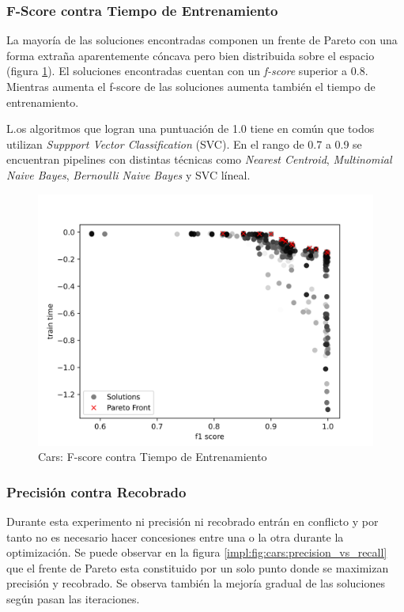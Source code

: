 \subsubsection{F-Score contra Tiempo de Entrenamiento}
La mayor\'ia de las soluciones encontradas componen un frente de Pareto con una forma extra\~na aparentemente c\'oncava pero bien distribuida sobre el espacio (figura \ref{impl:fig:cars:fscore_vs_time}).  El soluciones encontradas cuentan con un \textit{f-score} superior a 0.8. Mientras aumenta el f-score de las soluciones aumenta tambi\'en el tiempo de entrenamiento.

L.os algoritmos que logran una puntuaci\'on de 1.0 tiene en com\'un que todos utilizan \textit{Suppport Vector Classification} (SVC). En el rango de 0.7 a 0.9 se encuentran pipelines con distintas t\'ecnicas como \textit{Nearest Centroid}, \textit{Multinomial Naive Bayes}, \textit{Bernoulli Naive Bayes} y SVC l\'ineal.

\begin{figure}[ht]
    \centering
    \includegraphics[scale=0.65]{Pictures/cars_fscore_vs_time.jpg}
    \caption{Cars: F-score contra Tiempo de Entrenamiento}
    \label{impl:fig:cars:fscore_vs_time}
\end{figure}


\subsubsection{Precisi\'on contra Recobrado}
Durante esta experimento  ni precisi\'on ni recobrado entr\'an en conflicto y por tanto no es necesario hacer concesiones entre una o la otra durante la optimizaci\'on. Se puede observar en la figura \ref{impl:fig:cars:precision_vs_recall} que el frente de Pareto esta constituido por un solo punto donde se maximizan precisi\'on y recobrado. Se observa tambi\'en la mejor\'ia gradual de las soluciones seg\'un pasan las iteraciones. 

